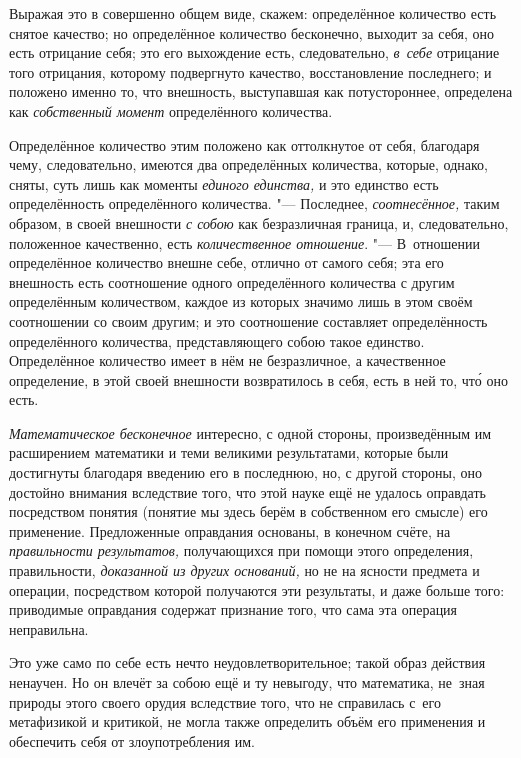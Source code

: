 Выражая это в совершенно общем виде, скажем: определённое количество есть
снятое качество; но определённое количество бесконечно, выходит за себя, оно
есть отрицание себя; это его выхождение есть, следовательно, {\em в~себе}
отрицание того отрицания, которому подвергнуто качество, восстановление
последнего; и положено именно то, что внешность, выступавшая как потустороннее,
определена как {\em собственный момент} определённого количества.

Определённое количество этим положено как оттолкнутое от себя, благодаря чему,
следовательно, имеются два определённых количества, которые, однако, сняты,
суть лишь как моменты {\em единого единства,} и это единство есть
определённость определённого количества. "--- Последнее, {\em соотнесённое,}
таким образом, в своей внешности {\em с собою} как безразличная граница, и,
следовательно, положенное качественно, есть {\em количественное отношение}.
"--- В~отношении определённое количество внешне себе, отлично от самого себя;
эта его внешность есть соотношение одного определённого количества с другим
определённым количеством, каждое из которых значимо лишь в этом своём
соотношении со своим другим; и это соотношение составляет определённость
определённого количества, представляющего собою такое единство. Определённое
количество имеет в нём не безразличное, а качественное определение, в этой
своей внешности возвратилось в себя, есть в ней то, чт\'{о} оно есть.


{\em Математическое бесконечное} интересно, с одной стороны, произведённым им
расширением математики и теми великими результатами, которые были достигнуты
благодаря введению его в последнюю, но, с другой стороны, оно достойно внимания
вследствие того, что этой науке ещё не удалось оправдать посредством понятия
(понятие мы здесь берём в собственном его смысле) его применение. Предложенные
оправдания основаны, в конечном счёте, на {\em правильности результатов,}
получающихся при помощи этого определения, правильности,
{\em доказанной из других оснований,} но не на ясности предмета и операции,
посредством которой получаются эти результаты, и даже больше того: приводимые
оправдания содержат признание того, что сама эта операция неправильна.

Это уже само по себе есть нечто неудовлетворительное; такой образ действия
ненаучен. Но он влечёт за собою ещё и ту невыгоду, что математика, не~зная
природы этого своего орудия вследствие того, что не справилась с~его
метафизикой и критикой, не могла также определить объём его применения
и обеспечить себя от злоупотребления им.

